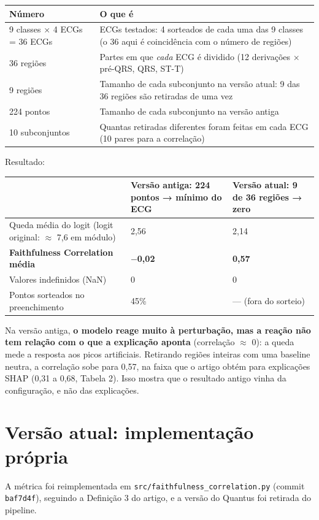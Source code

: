 \documentclass[11pt,a4paper]{article}
\begin{document}
\begin{center}\small
\begin{tabularx}{\linewidth}{lX}
\toprule
\textbf{Número} & \textbf{O que é} \\
\midrule
9 classes × 4 ECGs = 36 ECGs & ECGs testados: 4 sorteados de cada uma das 9 classes (o 36 aqui é coincidência com o número de regiões) \\
36 regiões & Partes em que \textit{cada} ECG é dividido (12 derivações × pré-QRS, QRS, ST-T) \\
9 regiões & Tamanho de cada subconjunto na versão atual: 9 das 36 regiões são retiradas de uma vez \\
224 pontos & Tamanho de cada subconjunto na versão antiga \\
10 subconjuntos & Quantas retiradas diferentes foram feitas em cada ECG (10 pares para a correlação) \\
\bottomrule
\end{tabularx}
\end{center}

Resultado:
\begin{center}\small
\begin{tabularx}{\linewidth}{XXX}
\toprule
& \textbf{Versão antiga}: 224 pontos → mínimo do ECG & \textbf{Versão atual}: 9 de 36 regiões → zero \\
\midrule
Queda média do logit (logit original: $\approx$ 7,6 em módulo) & 2,56 & 2,14 \\
\textbf{Faithfulness Correlation média} & \textbf{$-$0,02} & \textbf{0,57} \\
Valores indefinidos (NaN) & 0 & 0 \\
Pontos sorteados no preenchimento & 45\% & — (fora do sorteio) \\
\bottomrule
\end{tabularx}
\end{center}
Na versão antiga, \textbf{o modelo reage muito à perturbação, mas a reação não tem relação com o que a explicação aponta} (correlação $\approx$ 0): a queda mede a resposta aos picos artificiais. Retirando regiões inteiras com uma baseline neutra, a correlação sobe para 0,57, na faixa que o artigo obtém para explicações SHAP (0,31 a 0,68, Tabela 2). Isso mostra que o resultado antigo vinha da configuração, e não das explicações.

\section{Versão atual: implementação própria}
A métrica foi reimplementada em \texttt{src/faithfulness\_correlation.py} (commit \texttt{baf7d4f}), seguindo a Definição 3 do artigo, e a versão do Quantus foi retirada do pipeline.
\end{document}
